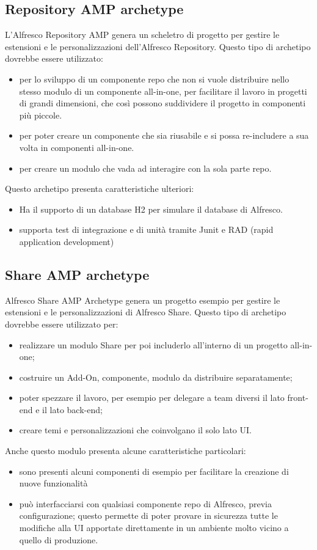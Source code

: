\subsection{Repository AMP archetype}
L’Alfresco Repository AMP genera un scheletro di progetto per gestire le estensioni e le
personalizzazioni dell’Alfresco Repository. Questo tipo di archetipo dovrebbe essere utilizzato:
\begin{itemize}
\item  per lo sviluppo di un componente repo che non si vuole distribuire nello stesso modulo di un componente all-in-one, per facilitare il lavoro in progetti di grandi dimensioni, che così possono suddividere il progetto in componenti più piccole.
\item per poter creare un componente che sia riusabile e si possa re-includere a sua volta in componenti all-in-one.
\item per creare un modulo che vada ad interagire con la sola parte repo.
\end{itemize}
Questo archetipo presenta caratteristiche ulteriori:
\begin{itemize}
\item Ha il supporto di un database H2 per simulare il database di Alfresco.
\item supporta test di integrazione e di unità tramite Junit e RAD (rapid application development)
\end{itemize}
\subsection{Share AMP archetype}
Alfresco Share AMP Archetype genera un progetto esempio per gestire le estensioni e
le personalizzazioni di Alfresco Share. Questo tipo di archetipo dovrebbe essere utilizzato per:
\begin{itemize}
\item realizzare un modulo Share per poi includerlo all’interno di un progetto all-in-one;
\item costruire un Add-On, componente, modulo da distribuire separatamente;
\item poter spezzare il lavoro, per esempio per delegare a team diversi il lato front-end e il lato back-end;
\item creare temi e personalizzazioni che coinvolgano il solo lato UI.
\end{itemize}
Anche questo modulo presenta alcune caratteristiche particolari:
\begin{itemize}
\item sono presenti alcuni componenti di esempio per facilitare la creazione di nuove funzionalità
\item può interfacciarsi con qualsiasi componente repo di Alfresco, previa configurazione; questo permette di poter provare in sicurezza tutte le modifiche alla UI apportate direttamente in un ambiente molto vicino a quello di produzione.
\end{itemize}
